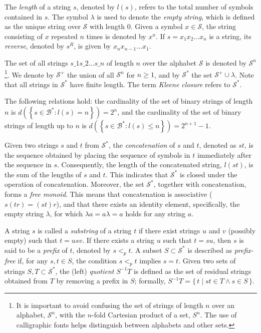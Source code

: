 The \emph{length} of a string $s$, denoted by $l(s)$, refers to the total number of symbols contained in $s$. The symbol $\lambda$ is used to denote the \emph{empty string}, which is defined as the unique string over $\mathcal{S}$ with length 0. Given a symbol $x \in \mathcal{S}$, the string consisting of $x$ repeated $n$ times is denoted by $x^n$. If $s = x_1 x_2 \dots x_n$ is a string, its \emph{reverse}, denoted by $s^R$, is given by $x_n x_{n-1} \dots x_1$.

The set of all strings $s\_{1}s\_{2}\ldots s\_{n}$ of length $n$ over the alphabet $\mathcal{S}$ is denoted by $\mathcal{S}^{n}$\footnote{It is important to avoid confusing the set of strings of length $n$ over an alphabet, $\mathcal{S}^n$, with the $n$-fold Cartesian product of a set, $S^n$. The use of calligraphic fonts helps distinguish between alphabets and other sets.}. We denote by $\mathcal{S}^{+}$ the union of all $\mathcal{S}^{n}$ for $n \geq 1$, and by $\mathcal{S}^{\ast}$ the set $\mathcal{S}^{+} \cup {\lambda}$. Note that all strings in $\mathcal{S}^{\ast}$ have finite length. The term \emph{Kleene closure} refers to $\mathcal{S}^{\ast}$.

\begin{example}
The following relations hold: the cardinality of the set of binary strings of length $n$ is $d \left( \left\{ s \in \mathcal{B}^{\ast} : l(s) = n \right\} \right) = 2^n$, and the cardinality of the set of binary strings of length up to $n$ is $d \left( \left\{ s \in \mathcal{B}^{\ast} : l(s) \leq n \right\} \right) = 2^{n+1}-1$.
\end{example}

Given two strings $s$ and $t$ from $\mathcal{S}^{\ast}$, the \emph{concatenation} of $s$ and $t$, denoted as $st$, is the sequence obtained by placing the sequence of symbols in $t$ immediately after the sequence in $s$. Consequently, the length of the concatenated string, $l(st)$, is the sum of the lengths of $s$ and $t$. This indicates that $\mathcal{S}^\ast$ is closed under the operation of concatenation. Moreover, the set $\mathcal{S}^\ast$, together with concatenation, forms a \emph{free monoid}. This means that concatenation is associative ($s(tr) = (st)r$), and that there exists an identity element, specifically, the empty string $\lambda$, for which $\lambda a = a \lambda = a$ holds for any string $a$.

A string $s$ is called a \emph{substring} of a string $t$ if there exist strings $u$ and $v$ (possibly empty) such that $t = usv$. If there exists a string $u$ such that $t = su$, then $s$ is said to be a \emph{prefix} of $t$, denoted by $s <_p t$. A subset $S \subset \mathcal{S}^{\ast}$ is described as \emph{prefix-free} if, for any $s, t \in S$, the condition $s <_p t$ implies $s = t$. Given two sets of strings $S, T \subset \mathcal{S}^{\ast}$, the (left) \emph{quotient} $S^{-1}T$ is defined as the set of residual strings obtained from $T$ by removing a prefix in $S$; formally, $S^{-1}T = \{\, t \mid st \in T \land s \in S \,\}$.

